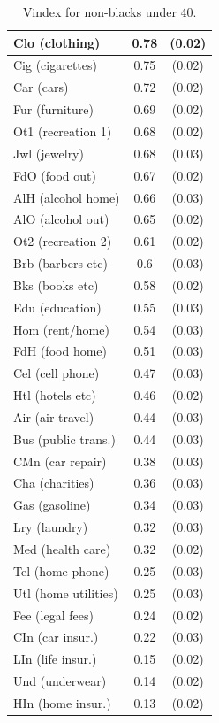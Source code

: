 \documentclass{article}
\begin{document}
\begin{table}
	\begin{center}
\begin{tabular}{|l|c|c|}
	\hline
Clo (clothing) & 0.78 & (0.02)\\ 
	\hline
Cig (cigarettes) & 0.75 & (0.02)\\ 
	\hline
Car (cars) & 0.72 & (0.02)\\ 
	\hline
Fur (furniture) & 0.69 & (0.02)\\ 
	\hline
Ot1 (recreation 1) & 0.68 & (0.02)\\ 
	\hline
Jwl (jewelry) & 0.68 & (0.03)\\ 
	\hline
FdO (food out) & 0.67 & (0.02)\\ 
	\hline
AlH (alcohol home) & 0.66 & (0.03)\\ 
	\hline
AlO (alcohol out) & 0.65 & (0.02)\\ 
	\hline
Ot2 (recreation 2) & 0.61 & (0.02)\\ 
	\hline
Brb (barbers etc) & 0.6 & (0.03)\\ 
	\hline
Bks (books etc) & 0.58 & (0.02)\\ 
	\hline
Edu (education) & 0.55 & (0.03)\\ 
	\hline
Hom (rent/home) & 0.54 & (0.03)\\ 
	\hline
FdH (food home) & 0.51 & (0.03)\\ 
	\hline
Cel (cell phone) & 0.47 & (0.03)\\ 
	\hline
Htl (hotels etc) & 0.46 & (0.02)\\ 
	\hline
Air (air travel) & 0.44 & (0.03)\\ 
	\hline
Bus (public trans.) & 0.44 & (0.03)\\ 
	\hline
CMn (car repair) & 0.38 & (0.03)\\ 
	\hline
Cha (charities) & 0.36 & (0.03)\\ 
	\hline
Gas (gasoline) & 0.34 & (0.03)\\ 
	\hline
Lry (laundry) & 0.32 & (0.03)\\ 
	\hline
Med (health care) & 0.32 & (0.02)\\ 
	\hline
Tel (home phone) & 0.25 & (0.03)\\ 
	\hline
Utl (home utilities) & 0.25 & (0.03)\\ 
	\hline
Fee (legal fees) & 0.24 & (0.02)\\ 
	\hline
CIn (car insur.) & 0.22 & (0.03)\\ 
	\hline
LIn (life insur.) & 0.15 & (0.02)\\ 
	\hline
Und (underwear) & 0.14 & (0.02)\\ 
	\hline
HIn (home insur.) & 0.13 & (0.02)\\ 
	\hline
\end{tabular}
\end{center}
\label{tab:vintab}
\caption{Vindex for non-blacks under 40.}
\vspace{-2in}
\end{table}
\end{document}
